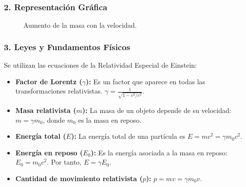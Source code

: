 \subsubsection*{2. Representación Gráfica}
\begin{figure}[H]
    \centering
    \caption{Aumento de la masa con la velocidad.}
\end{figure}

\subsubsection*{3. Leyes y Fundamentos Físicos}
Se utilizan las ecuaciones de la Relatividad Especial de Einstein:
\begin{itemize}
    \item \textbf{Factor de Lorentz ($\gamma$):} Es un factor que aparece en todas las transformaciones relativistas. $\gamma = \frac{1}{\sqrt{1 - v^2/c^2}}$.
    \item \textbf{Masa relativista ($m$):} La masa de un objeto depende de su velocidad: $m = \gamma m_0$, donde $m_0$ es la masa en reposo.
    \item \textbf{Energía total ($E$):} La energía total de una partícula es $E = mc^2 = \gamma m_0 c^2$.
    \item \textbf{Energía en reposo ($E_0$):} Es la energía asociada a la masa en reposo: $E_0 = m_0 c^2$. Por tanto, $E = \gamma E_0$.
    \item \textbf{Cantidad de movimiento relativista ($p$):} $p = mv = \gamma m_0 v$.
\end{itemize}

